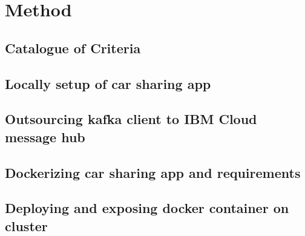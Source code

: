 
\chapter{Method}

\section{Catalogue of Criteria}

\section{Locally setup of car sharing app}

\section{Outsourcing kafka client to IBM Cloud message hub}

\section{Dockerizing car sharing app and requirements}

\section{Deploying and exposing docker container on cluster}

